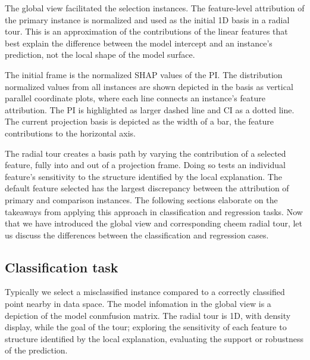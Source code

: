 \documentclass[
]{article}
\begin{document}
The global view facilitated the selection instances. The feature-level attribution of the primary instance is normalized and used as the initial 1D basis in a radial tour. This is an approximation of the contributions of the linear features that best explain the difference between the model intercept and an instance's prediction, not the local shape of the model surface.

The initial frame is the normalized SHAP values of the PI. The distribution normalized values from all instances are shown depicted in the basis as vertical parallel coordinate plots, where each line connects an instance's feature attribution. The PI is highlighted as larger dashed line and CI as a dotted line. The current projection basis is depicted as the width of a bar, the feature contributions to the horizontal axis.

The radial tour creates a basis path by varying the contribution of a selected feature, fully into and out of a projection frame. Doing so tests an individual feature's sensitivity to the structure identified by the local explanation. The default feature selected has the largest discrepancy between the attribution of primary and comparison instances. The following sections elaborate on the takeaways from applying this approach in classification and regression tasks. Now that we have introduced the global view and corresponding cheem radial tour, let us discuss the differences between the classification and regression cases.

\hypertarget{classification-task}{%
\subsection{Classification task}\label{classification-task}}

Typically we select a misclassified instance compared to a correctly classified point nearby in data space. The model infomation in the global view is a depiction of the model conmfusion matrix. The radial tour is 1D, with density display, while the goal of the tour; exploring the sensitivity of each feature to structure identified by the local explanation, evaluating the support or robustness of the prediction.
\end{document}
